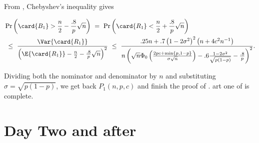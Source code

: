 \documentclass{toc}
\begin{document}
			
			\noindent From  , %
			Chebyshev's inequality gives
			\begin{linenomath}\begin{equation*} \label{eq:chebyshev-R1-bound}
					\begin{aligned}
						& \Pr \left(\card{B_1} > \frac{n}{2} - \frac{.8}{p}\sqrt{n} \right)
						\ = \ \Pr \left(\card{R_1} < \frac{n}{2} + \frac{.8}{p}\sqrt{n} \right) \\
						& \ \le \ \frac{\Var{\card{R_1}}}{\left(\E{\card{R_1}} - \frac{n}{2} - \frac{.8}{p}\sqrt{n}\right)^2}
						\ \le \ \frac{.25n + .7\left(1 - 2\sigma^2\right)^2 \left(n + 4c^2n^{-1}\right)}
						{n\left(\sqrt{n}\Phi_0\left(\frac{2pc  %
								+ \min\{p, 1 - p\}  %
							}{\sigma\sqrt{n}}\right) - .6\frac{1 - 2\sigma^2}{\sqrt{p(1 - p)}} - \frac{.8}{p} \right)^2}.
					\end{aligned}
			\end{equation*}\end{linenomath}
			Dividing both the nominator and denominator by $n$ and substituting $\sigma = \sqrt{p(1 - p)}$, we get back $P_1(n, p, c)$ and finish
			the proof of .
			art one of  is complete.
			
			\section{Day Two and after} \label{sec:universal-win}
			
\end{document}
